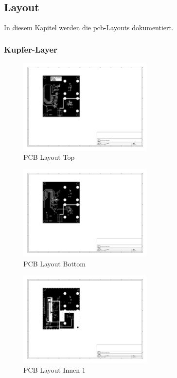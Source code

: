 \documentclass[11pt,a4paper,hidelinks]{article}
\begin{document}
\pagebreak

\subsection{Layout}

In diesem Kapitel werden die \acrshort{pcb}-Layouts dokumentiert.

\subsubsection{Kupfer-Layer}

\begin{figure}[H]
    \centering
    \includegraphics[trim=130 220 450 80, clip, width=0.6\textwidth]{attachments/pcb_F_Cu.pdf}
    \caption{PCB Layout Top}\label{fig:pcb_f_cu}
\end{figure}

\begin{figure}[H]
    \centering
    \includegraphics[trim=130 220 450 80, clip, width=0.6\textwidth]{attachments/pcb_B_Cu.pdf}
    \caption{PCB Layout Bottom}\label{fig:pcb_b_cu}
\end{figure}

\begin{figure}[H]
    \centering
    \includegraphics[trim=130 220 450 80, clip, width=0.6\textwidth]{attachments/pcb_In1_Cu.pdf}
    \caption{PCB Layout Innen 1}\label{fig:pcb_in1_cu}
\end{figure}
\end{document}
